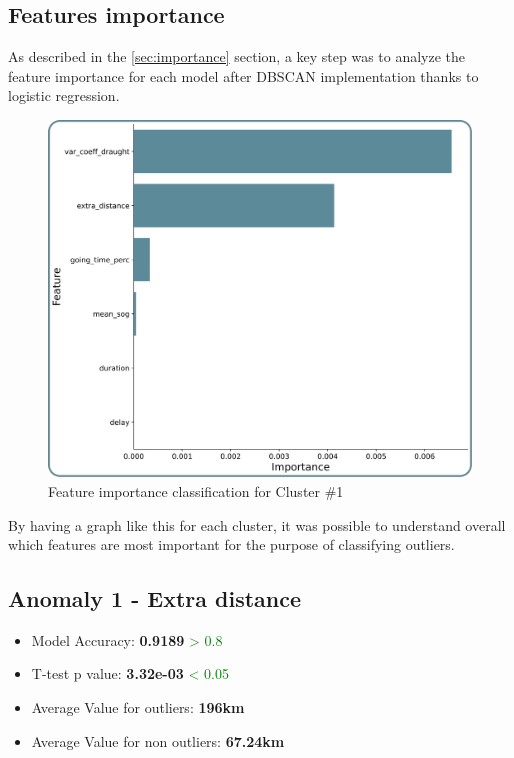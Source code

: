 \subsection{Features importance}
\label{sec:testing-importance}

As described in the \ref{sec:importance} section, a key step was to analyze the feature importance for each model after DBSCAN implementation thanks to logistic regression.

\begin{figure}[H]
    \centering
    \includegraphics[width=13cm]{Images/3/importance.png}
    \caption{Feature importance classification for Cluster \#1}
\end{figure}

By having a graph like this for each cluster, it was possible to understand overall which features are most important for the purpose of classifying outliers.

\clearpage
\subsection{Anomaly 1 - Extra distance}
\label{sec:anomaly-1}

\begin{itemize}
\item Model Accuracy: \textbf{0.9189} \textcolor{green}{> 0.8}
\item T-test p value: \textbf{3.32e-03} \textcolor{green}{< 0.05}
\item Average Value for outliers: \textbf{196km}
\item Average Value for non outliers: \textbf{67.24km}
\end{itemize}

